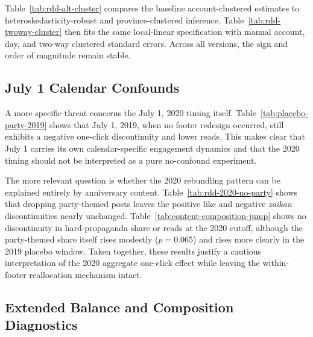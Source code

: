 \documentclass[12pt, american]{article}
\begin{document}
Table~\ref{tab:rdd-alt-cluster} compares the baseline account-clustered estimates to heteroskedasticity-robust and province-clustered inference. Table~\ref{tab:rdd-twoway-cluster} then fits the same local-linear specification with manual account, day, and two-way clustered standard errors. Across all versions, the sign and order of magnitude remain stable.







\subsection{July 1 Calendar Confounds}

A more specific threat concerns the July 1, 2020 timing itself. Table~\ref{tab:placebo-party-2019} shows that July 1, 2019, when no footer redesign occurred, still exhibits a negative one-click discontinuity and lower reads. This makes clear that July 1 carries its own calendar-specific engagement dynamics and that the 2020 timing should not be interpreted as a pure no-confound experiment.

The more relevant question is whether the 2020 rebundling pattern can be explained entirely by anniversary content. Table~\ref{tab:rdd-2020-no-party} shows that dropping party-themed posts leaves the positive like and negative \textit{zaikan} discontinuities nearly unchanged. Table~\ref{tab:content-composition-jump} shows no discontinuity in hard-propaganda share or reads at the 2020 cutoff, although the party-themed share itself rises modestly ($p = 0.065$) and rises more clearly in the 2019 placebo window. Taken together, these results justify a cautious interpretation of the 2020 aggregate one-click effect while leaving the within-footer reallocation mechanism intact.







\subsection{Extended Balance and Composition Diagnostics}
\end{document}
